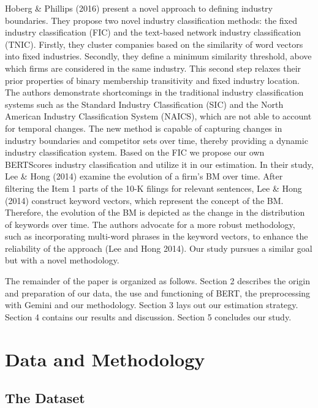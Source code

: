 \documentclass[
]{article}
\begin{document}
Hoberg \& Phillips (2016) present a novel approach to defining industry
boundaries. They propose two novel industry classification methods: the
fixed industry classification (FIC) and the text-based network industry
classification (TNIC). Firstly, they cluster companies based on the
similarity of word vectors into fixed industries. Secondly, they define
a minimum similarity threshold, above which firms are considered in the
same industry. This second step relaxes their prior properties of binary
membership transitivity and fixed industry location. The authors
demonstrate shortcomings in the traditional industry classification
systems such as the Standard Industry Classification (SIC) and the North
American Industry Classification System (NAICS), which are not able to
account for temporal changes. The new method is capable of capturing
changes in industry boundaries and competitor sets over time, thereby
providing a dynamic industry classification system. Based on the FIC we
propose our own BERTScores industry classification and utilize it in our
estimation. In their study, Lee \& Hong (2014) examine the evolution of
a firm's BM over time. After filtering the Item 1 parts of the 10-K
filings for relevant sentences, Lee \& Hong (2014) construct keyword
vectors, which represent the concept of the BM. Therefore, the evolution
of the BM is depicted as the change in the distribution of keywords over
time. The authors advocate for a more robust methodology, such as
incorporating multi-word phrases in the keyword vectors, to enhance the
reliability of the approach (Lee and Hong 2014). Our study pursues a
similar goal but with a novel methodology.

The remainder of the paper is organized as follows. Section 2 describes
the origin and preparation of our data, the use and functioning of BERT,
the preprocessing with Gemini and our methodology. Section 3 lays out
our estimation strategy. Section 4 contains our results and discussion.
Section 5 concludes our study.

\section{Data and Methodology}\label{data-and-methodology}

\subsection{The Dataset}\label{the-dataset}
\end{document}
